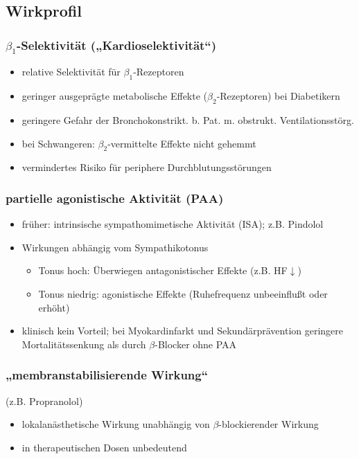 \documentclass[10pt,a4paper]{report}
\begin{document}
\subsection{Wirkprofil}
\subsubsection{$\beta_1$-Selektivität („Kardioselektivität“)}
\begin{itemize}
	\item relative Selektivität für $\beta_1$-Rezeptoren 
	\item geringer ausgeprägte metabolische Effekte ($\beta_2$-Rezeptoren) bei Diabetikern 
	\item geringere Gefahr der Bronchokonstrikt. b. Pat. m. obstrukt. Ventilationsstörg.
	\item  bei Schwangeren: $\beta_2$-vermittelte Effekte nicht gehemmt
	\item vermindertes Risiko für periphere Durchblutungsstörungen
\end{itemize}
\subsubsection{partielle agonistische Aktivität (PAA)}
\begin{itemize}
	\item früher: intrinsische sympathomimetische Aktivität (ISA); z.B. Pindolol
	\item Wirkungen abhängig vom Sympathikotonus
	\begin{itemize}
		\item Tonus hoch: Überwiegen antagonistischer Effekte (z.B. HF$\downarrow$) 
	  	\item Tonus niedrig: agonistische Effekte (Ruhefrequenz unbeeinflußt oder erhöht)
	\end{itemize}		  
	\item klinisch kein Vorteil; bei Myokardinfarkt und Sekundärprävention geringere Mortalitätssenkung als durch $\beta$-Blocker ohne PAA
\end{itemize}
\subsubsection{„membranstabilisierende Wirkung“} (z.B. Propranolol)
\begin{itemize}
	\item lokalanästhetische Wirkung unabhängig von $\beta$-blockierender Wirkung
	\item in therapeutischen Dosen unbedeutend
\end{itemize}
\end{document}
